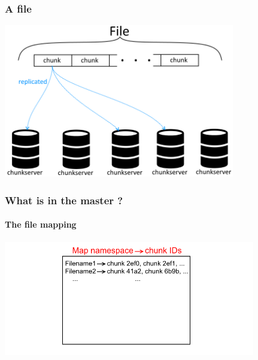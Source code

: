 \documentclass{beamer}
\newcommand{\slideheight}{6.7cm}
\begin{document}
\begin{frame}
 \frametitle{A file}
 \centering
 \includegraphics[height=\slideheight]{figures/filegfsschema.png}
\end{frame}

\newcommand{\masterpicheight}{5cm}
\begin{frame}
 \frametitle{What is in the master ?}
 \framesubtitle{The file mapping}
 \centering
 \includegraphics[height=\masterpicheight]{figures/namespaceMapschema.png}
\end{frame}
\end{document}
